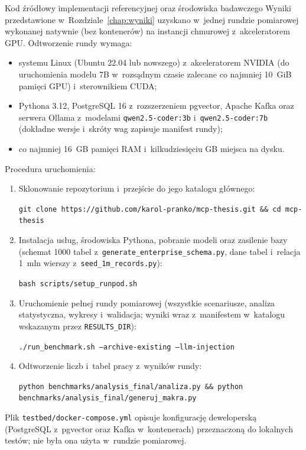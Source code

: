 \begin{easyappendix}{Kod źródłowy implementacji referencyjnej oraz środowiska badawczego}
Wyniki przedstawione w~Rozdziale~\ref{chap:wyniki} uzyskano w~jednej rundzie pomiarowej wykonanej natywnie (bez kontenerów) na instancji chmurowej z~akceleratorem GPU. Odtworzenie rundy wymaga:
\begin{itemize}
    \item systemu Linux (Ubuntu 22.04 lub nowszego) z~akceleratorem NVIDIA (do uruchomienia modelu 7B w~rozsądnym czasie zalecane co najmniej 10~GiB pamięci GPU) i~sterownikiem CUDA;
    \item Pythona 3.12, PostgreSQL 16 z~rozszerzeniem pgvector, Apache Kafka oraz serwera Ollama z~modelami \texttt{qwen2.5-coder:3b} i~\texttt{qwen2.5-coder:7b} (dokładne wersje i~skróty wag zapisuje manifest rundy);
    \item co najmniej 16~GB pamięci RAM i~kilkudziesięciu GB miejsca na dysku.
\end{itemize}

Procedura uruchomienia:
\begin{enumerate}
    \item Sklonowanie repozytorium i~przejście do jego katalogu głównego:
    \begin{center}
        \texttt{git clone https://github.com/karol-pranko/mcp-thesis.git \&\& cd mcp-thesis}
    \end{center}
    \item Instalacja usług, środowiska Pythona, pobranie modeli oraz zasilenie bazy (schemat 1000 tabel z~\texttt{generate\_enterprise\_schema.py}, dane tabel i~relacja 1~mln wierszy z~\texttt{seed\_1m\_records.py}):
    \begin{center}
        \texttt{bash scripts/setup\_runpod.sh}
    \end{center}
    \item Uruchomienie pełnej rundy pomiarowej (wszystkie scenariusze, analiza statystyczna, wykresy i~walidacja; wyniki wraz z~manifestem w~katalogu wskazanym przez \texttt{RESULTS\_DIR}):
    \begin{center}
        \texttt{./run\_benchmark.sh --archive-existing --llm-injection}
    \end{center}
    \item Odtworzenie liczb i~tabel pracy z~wyników rundy:
    \begin{center}
        \texttt{python benchmarks/analysis\_final/analiza.py \&\& python benchmarks/analysis\_final/generuj\_makra.py}
    \end{center}
\end{enumerate}
Plik \texttt{testbed/docker-compose.yml} opisuje konfigurację deweloperską (PostgreSQL z~pgvector oraz Kafka w~kontenerach) przeznaczoną do lokalnych testów; nie była ona użyta w~rundzie pomiarowej.

\end{easyappendix}

